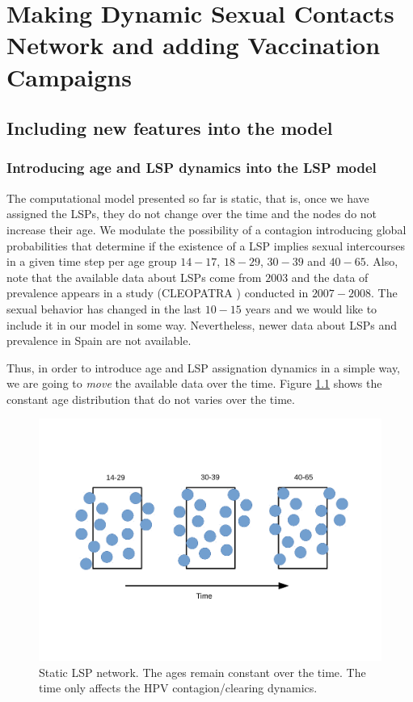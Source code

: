 \chapter{Making Dynamic Sexual Contacts Network and adding Vaccination Campaigns}\label{DinamicaYVacunacion}
\section{Including new features into the model}
\subsection{Introducing age and LSP dynamics into the LSP model}
The computational model presented so far is static, that is, once we have assigned the LSPs, they do not change over the time and the nodes do not increase their age. We modulate the possibility of a contagion introducing global probabilities that determine if the existence of a LSP implies sexual intercourses in a given time step per age group $14-17$, $18-29$, $30-39$ and $40-65$. Also, note that the available data about LSPs come from $2003$ and the data of prevalence appears in a study (CLEOPATRA \cite{castellsague2012prevalence}) conducted in $2007-2008$. The sexual behavior has changed in the last $10-15$ years and we would like to include it in our model in some way. Nevertheless, newer data about LSPs and prevalence in Spain are not available.

Thus, in order to introduce age and LSP assignation dynamics in a simple way, we are going to \textit{move} the available data over the time. Figure \ref{fig:dinam1} shows the constant age distribution that do not varies over the time.

\begin{figure}[h!]
	\centering
	\includegraphics[width=0.7\linewidth]{IMGs/2.-New_features/Dinam_1.pdf}
	\caption{Static LSP network. The ages remain constant over the time. The time only affects the HPV contagion/clearing dynamics.}
	\label{fig:dinam1}
\end{figure}

